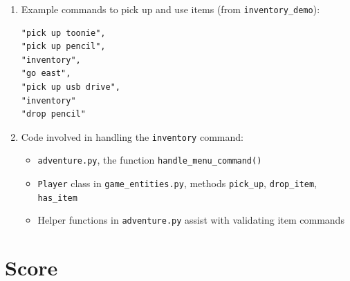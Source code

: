 \documentclass[11pt]{article}
\begin{document}
\begin{enumerate}
\begin{enumerate}
\begin{itemize}
            \item Item name: "lucky mug"
            \item Item start location ID: 6
            \item Item target location ID: 11
        \end{itemize}
        \item Item 7:
        \begin{itemize}
            \item Item name: "laptop charger"
            \item Item start location ID: 9
            \item Item target location ID: 11
        \end{itemize}
    \end{enumerate}

    \item Example commands to pick up and use items (from \texttt{inventory\_demo}):
    \begin{verbatim}
"pick up toonie",
"pick up pencil",
"inventory",
"go east",
"pick up usb drive",
"inventory"
"drop pencil"
    \end{verbatim}

    \item Code involved in handling the \texttt{inventory} command:
    \begin{itemize}
        \item \texttt{adventure.py}, the function \texttt{handle\_menu\_command()}
        \item \texttt{Player} class in \texttt{game\_entities.py}, methods \texttt{pick\_up}, \texttt{drop\_item}, \texttt{has\_item} 
        \item Helper functions in \texttt{adventure.py} assist with validating item commands
    \end{itemize}
\end{enumerate}

\section*{Score}
\end{document}

